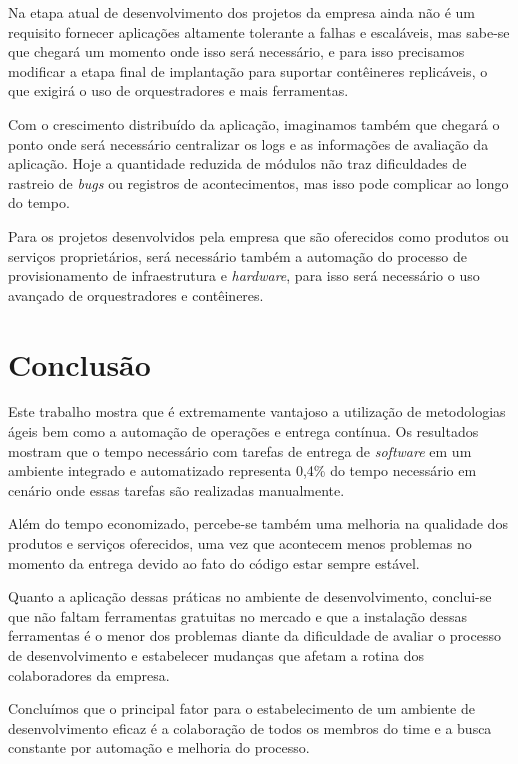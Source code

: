 \documentclass[
	12pt,				%
	openright,			%
	oneside,			%
	a4paper,			%
	english,			%
	french,				%
	spanish,			%
	brazil,				%
	]{abntex2}
\begin{document}
Na etapa atual de desenvolvimento dos projetos da empresa ainda não é um requisito fornecer aplicações altamente tolerante a falhas e escaláveis, mas sabe-se que chegará um momento onde isso será necessário, e para isso precisamos modificar a etapa final de implantação para suportar contêineres replicáveis, o que exigirá o uso de orquestradores e mais ferramentas.

Com o crescimento distribuído da aplicação, imaginamos também que chegará o ponto onde será necessário centralizar os logs e as informações de avaliação da aplicação. Hoje a quantidade reduzida de módulos não traz dificuldades de rastreio de \textit{bugs} ou registros de acontecimentos, mas isso pode complicar ao longo do tempo.

Para os projetos desenvolvidos pela empresa que são oferecidos como produtos ou serviços proprietários, será necessário também a automação do processo de provisionamento de infraestrutura e \textit{hardware}, para isso será necessário o uso avançado de orquestradores e contêineres.


\chapter{Conclusão}

Este trabalho mostra que é extremamente vantajoso a utilização de metodologias ágeis bem como a automação de operações e entrega contínua. Os resultados mostram que o tempo necessário com tarefas de entrega de \textit{software} em um ambiente integrado e automatizado representa 0,4\% do tempo necessário em cenário onde essas tarefas são realizadas manualmente.

Além do tempo economizado, percebe-se também uma melhoria na qualidade dos produtos e serviços oferecidos, uma vez que acontecem menos problemas no momento da entrega devido ao fato do código estar sempre estável.

Quanto a aplicação dessas práticas no ambiente de desenvolvimento, conclui-se que não faltam ferramentas gratuitas no mercado e que a instalação dessas ferramentas é o menor dos problemas diante da dificuldade de avaliar o processo de desenvolvimento e estabelecer mudanças que afetam a rotina dos colaboradores da empresa.

Concluímos que o principal fator para o estabelecimento de um ambiente de desenvolvimento eficaz é a colaboração de todos os membros do time e a busca constante por automação e melhoria do processo.
\end{document}
